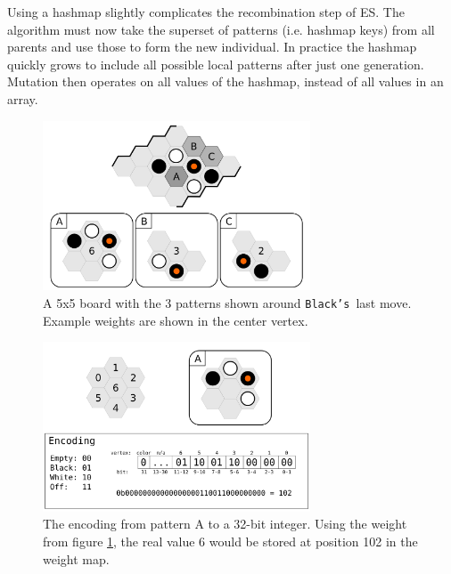 \documentclass[11pt]{report}
\newcommand{\blacks}{\texttt{Black's}}
\begin{document}
Using a hashmap slightly complicates the recombination step of ES. The algorithm must now take the superset of patterns (i.e. hashmap keys) from all parents and use those to form the new individual. In practice the hashmap quickly grows to include all possible local patterns after just one generation. Mutation then operates on all values of the hashmap, instead of all values in an array.

\begin{figure}
	\begin{center}
	\includegraphics[width=300px]{graphics/local-pattern.png}
	\caption{A 5x5 board with the 3 patterns shown around \blacks\ last move. Example weights are shown in the center vertex.}
	\label{fig:localpattern}
	\end{center}
\end{figure}

\begin{figure}
	\begin{center}
	\includegraphics[width=300px]{graphics/weight-pattern-map.png}
	\caption{The encoding from pattern A to a 32-bit integer. Using the weight from figure \ref{fig:localpattern}, the real value 6 would be stored at position 102 in the weight map.}
	\label{fig:encoding}
	\end{center}
\end{figure}
\end{document}
